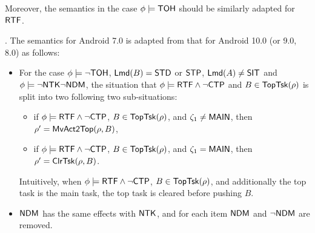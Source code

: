 {Moreover, the semantics in the case $\phi \models {\sf TOH}$ should be similarly adapted for ${\sf RTF}$.


\smallskip

.
The semantics for Android 7.0 is adapted from that for Android 10.0 (or 9.0, 8.0) as follows: 
%
\begin{itemize}
    \item 
For the case $\phi \models \neg {\sf TOH}$, ${\sf Lmd}(B) = {\sf STD}$ or ${\sf STP}$, ${\sf Lmd}(A) \neq {\sf SIT}$ and $\phi \models \neg {\sf NTK}\neg{\sf NDM}$, the situation that $\phi \models {\sf RTF} \wedge \neg {\sf CTP}$ and $B \in \mathsf{TopTsk}(\rho)$ is split into two following two sub-situations:
%
%
\begin{itemize}
\item if $\phi \models {\sf RTF} \wedge \neg {\sf CTP}$, $B \in \mathsf{TopTsk}(\rho)$, and $\zeta_1 \neq {\sf MAIN}$, then $\rho'=\mathsf{MvAct2Top}(\rho, B)$,
%
\item if $\phi \models {\sf RTF} \wedge \neg {\sf CTP}$, $B \in \mathsf{TopTsk}(\rho)$, and $\zeta_1 = {\sf MAIN}$, then $\rho' = \mathsf{ClrTsk}(\rho,B)$.
\end{itemize}
Intuitively, when $\phi \models {\sf RTF} \wedge \neg {\sf CTP}$, $B \in \mathsf{TopTsk}(\rho)$, and additionally the top task is the main task, the top task is cleared before pushing $B$.
    \item ${\sf NDM}$ has the same effects with ${\sf NTK}$, and for each item ${\sf NDM}$ and $\neg{\sf NDM}$ are removed.
\end{itemize}

}

